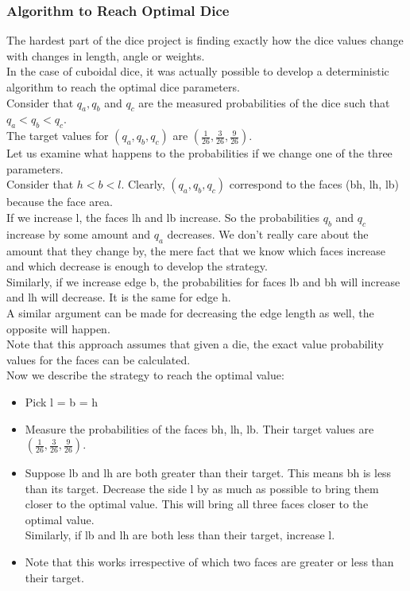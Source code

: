 \subsubsection{Algorithm to Reach Optimal Dice}
The hardest part of the dice project is finding exactly how the dice values change with changes in length, angle or weights.\\
In the case of cuboidal dice, it was actually possible to develop a deterministic algorithm to reach the optimal dice parameters.\\
Consider that $q_a, q_b$ and $q_c$ are the measured probabilities of the dice such that $q_a < q_b < q_c$.\\
The target values for $(q_a, q_b, q_c)$ are $(\frac{1}{26}, \frac{3}{26}, \frac{9}{26})$.\\
Let us examine what happens to the probabilities if we change one of the three parameters.\\
Consider that $h < b < l$. Clearly, $(q_a, q_b, q_c)$ correspond to the faces (bh, lh, lb) because the face area.\\
If we increase l, the faces lh and lb increase. So the probabilities $q_b$ and $q_c$ increase by some amount and $q_a$ decreases. We don't really care about the amount that they change by, the mere fact that we know which faces increase and which decrease is enough to develop the strategy.\\
Similarly, if we increase edge b, the probabilities for faces lb and bh will increase and lh will decrease. It is the same for edge h.\\
A similar argument can be made for decreasing the edge length as well, the opposite will happen.\\
Note that this approach assumes that given a die, the exact value probability values for the faces can be calculated.\\
Now we describe the strategy to reach the optimal value:\\
\begin{itemize}
    \item Pick l = b = h\\
    \item Measure the probabilities of the faces bh, lh, lb. Their target values are $(\frac{1}{26}, \frac{3}{26}, \frac{9}{26})$.\\
    \item Suppose lb and lh are both greater than their target. This means bh is less than its target. Decrease the side l by as much as possible to bring them closer to the optimal value. This will bring all three faces closer to the optimal value.\\
    Similarly, if lb and lh are both less than their target, increase l.\\
    \item Note that this works irrespective of which two faces are greater or less than their target.\\

\end{itemize}

